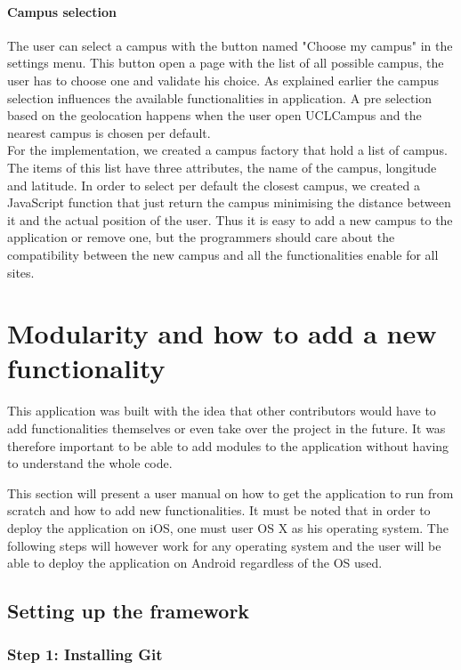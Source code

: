 \documentclass[11pt, a4paper]{report}
\begin{document}
\paragraph{Campus selection} The user can select a campus with the button named "Choose my campus" in the settings menu. This button open a page with the list of all possible campus, the user has to choose one and validate his choice. As explained earlier the campus selection influences the available functionalities in application. A pre selection based on the geolocation happens when the user open UCLCampus and the nearest campus is chosen per default.\\
For the implementation, we created a campus factory that hold a list of campus. The items of this list have three attributes, the name of the campus, longitude and latitude. In order to select per default the closest campus, we created a JavaScript function that just return the campus minimising the distance between it and the actual position of the user. Thus it is easy to add a new campus to the application or remove one, but the programmers should care about the compatibility between the new campus and all the functionalities enable for all sites. 


\section{Modularity and how to add a new functionality}
This application was built with the idea that other contributors would have to add functionalities themselves or even take over the project in the future. It was therefore important to be able to add modules to the application without having to understand the whole code. 

This section will present a user manual on how to get the application to run from scratch and how to add new functionalities.  It must be noted that in order to deploy the application on iOS, one must user OS X as his operating system.  The following steps will however work for any operating system and the user will be able to deploy the application on Android regardless of the OS used.

\subsection{Setting up the framework}

\subsubsection{Step 1: Installing Git}
\end{document}
